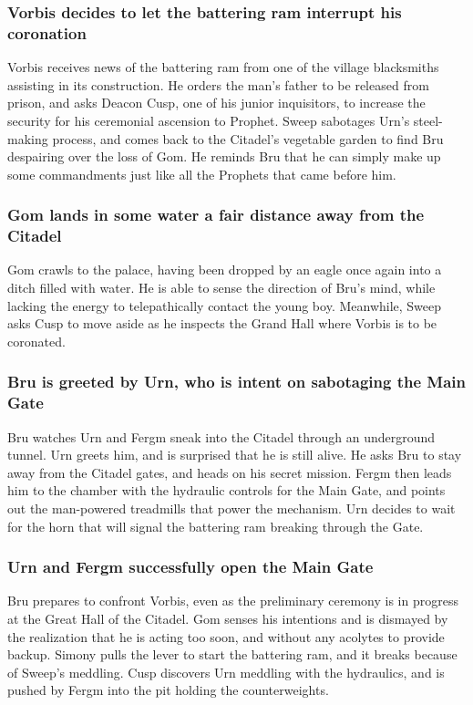 \subsubsection{\Gls{Vorbis} decides to let the battering ram interrupt his coronation}
\Gls{Vorbis} receives news of the battering ram from one of the village blacksmiths assisting in
its construction. He orders the man's father to be released from prison, and asks Deacon \Gls{Cusp},
one of his junior inquisitors, to increase the security for his ceremonial ascension to Prophet.
\Gls{Sweep} sabotages \Gls{Urn}'s steel-making process, and comes back to the Citadel's vegetable
garden to find \Gls{Bru} despairing over the loss of \Gls{Gom}. He reminds \Gls{Bru} that he can
simply make up some commandments just like all the Prophets that came before him.

\subsubsection{\Gls{Gom} lands in some water a fair distance away from the Citadel}
\Gls{Gom} crawls to the palace, having been dropped by an eagle once again into a ditch filled with
water. He is able to sense the direction of \Gls{Bru}'s mind, while lacking the energy to
telepathically contact the young boy. Meanwhile, \Gls{Sweep} asks \Gls{Cusp} to move aside as he
inspects the Grand Hall where \Gls{Vorbis} is to be coronated.

\subsubsection{\Gls{Bru} is greeted by \Gls{Urn}, who is intent on sabotaging the Main Gate}
\Gls{Bru} watches \Gls{Urn} and \Gls{Fergm} sneak into the Citadel through an underground tunnel.
\Gls{Urn} greets him, and is surprised that he is still alive. He asks \Gls{Bru} to stay
away from the Citadel gates, and heads on his secret mission. \Gls{Fergm} then leads him to the
chamber with the hydraulic controls for the Main Gate, and points out the man-powered treadmills
that power the mechanism. \Gls{Urn} decides to wait for the horn that will signal the battering ram
breaking through the Gate.

\subsubsection{\Gls{Urn} and \Gls{Fergm} successfully open the Main Gate}
\Gls{Bru} prepares to confront \Gls{Vorbis}, even as the preliminary ceremony is in progress at the
Great Hall of the Citadel. \Gls{Gom} senses his intentions and is dismayed by the realization that
he is acting too soon, and without any acolytes to provide backup. \Gls{Simony} pulls the lever to
start the battering ram, and it breaks because of \Gls{Sweep}'s meddling. \Gls{Cusp} discovers
\Gls{Urn} meddling with the hydraulics, and is pushed by \Gls{Fergm} into the pit holding the
counterweights.

